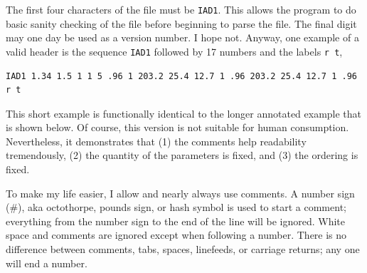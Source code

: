\documentclass{article}
\begin{document}
The first four characters of the file must be \texttt{IAD1}.  
This allows the program to do basic sanity checking of the file before 
beginning to parse the file.  The final digit may one day be used as
a version number.  I hope not.  Anyway, one example of a valid
header is the sequence
\texttt{IAD1} followed by 17 numbers and the labels \texttt{r t},
\begin{center}
\begin{minipage}{10cm}
\scriptsize
\begin{verbatim}
IAD1 1.34 1.5 1 1 5 .96 1 203.2 25.4 12.7 1 .96 203.2 25.4 12.7 1 .96 r t
\end{verbatim}
\end{minipage}
\end{center}
This short example is functionally identical to the longer annotated example
that is shown below.  Of course, this version is not suitable for human consumption.  
Nevertheless, it demonstrates that (1) the comments help readability tremendously, (2) the quantity of the parameters is fixed, and (3) the ordering is fixed.

To make my life easier, I allow and nearly always use comments.
A number sign (\#), aka octothorpe, pounds sign, or hash symbol is used to start a comment; everything
from the number sign to the end of the line will be ignored.
White space and comments are ignored except when following a number.  There
is no difference between comments, tabs, spaces, linefeeds, or carriage returns; any
one will end a number. 
\end{document}
